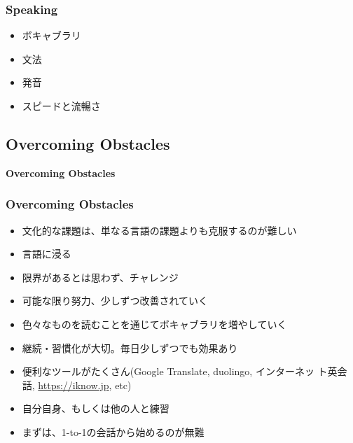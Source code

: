 \documentclass[aspectratio=169,11pt,hyperref={colorlinks=true}]{beamer}
\begin{document}
\begin{frame}
\frametitle{Speaking}
  \begin{itemize}
  \item ボキャブラリ
  \item 文法
  \item 発音
  \item スピードと流暢さ
  \end{itemize}
\end{frame}

\subsection{Overcoming Obstacles}
\begin{frame}
  \bf\Huge{Overcoming Obstacles}
\end{frame}

\begin{frame}
  \frametitle{Overcoming Obstacles}
  \begin{itemize}
  \item 文化的な課題は、単なる言語の課題よりも克服するのが難しい
  \item 言語に浸る
  \item 限界があるとは思わず、チャレンジ
  \item 可能な限り努力、少しずつ改善されていく
  \item 色々なものを読むことを通じてボキャブラリを増やしていく
  \item 継続・習慣化が大切。毎日少しずつでも効果あり
  \item 便利なツールがたくさん(Google Translate, duolingo, インターネッ
    ト英会話, \url{https://iknow.jp}, etc)
  \item 自分自身、もしくは他の人と練習
  \item まずは、1-to-1の会話から始めるのが無難
  \end{itemize}
\end{frame}
\end{document}
